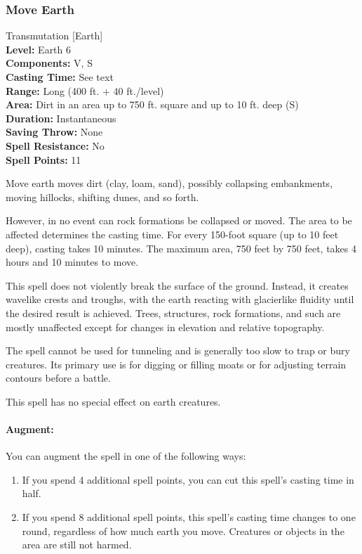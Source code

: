 \subsubsection{Move Earth}
\label{Spell:MoveEarth}
Transmutation [Earth]
\\ \textbf{Level:} Earth 6
\\ \textbf{Components:} V, S
\\ \textbf{Casting Time:} See text
\\ \textbf{Range:} Long (400 ft. + 40 ft./level)
\\ \textbf{Area:} Dirt in an area up to 750 ft. square and up to 10 ft. deep (S)
\\ \textbf{Duration:} Instantaneous
\\ \textbf{Saving Throw:} None
\\ \textbf{Spell Resistance:} No
\\ \textbf{Spell Points:} 11

Move earth moves dirt (clay, loam, sand), possibly collapsing embankments, moving hillocks, shifting dunes, and so forth.

However, in no event can rock formations be collapsed or moved. 
The area to be affected determines the casting time. For every 150-foot square (up to 10 feet deep), casting takes 10 minutes. 
The maximum area, 750 feet by 750 feet, takes 4 hours and 10 minutes to move.

This spell does not violently break the surface of the ground. 
Instead, it creates wavelike crests and troughs, with the earth reacting with glacierlike fluidity until the desired result is achieved. 
Trees, structures, rock formations, and such are mostly unaffected except for changes in elevation and relative topography.

The spell cannot be used for tunneling and is generally too slow to trap or bury creatures. 
Its primary use is for digging or filling moats or for adjusting terrain contours before a battle.

This spell has no special effect on earth creatures.

\paragraph{Augment:} You can augment the spell in one of the following ways:
\begin{enumerate}
 \item If you spend 4 additional spell points, you can cut this spell's casting time in half.
 \item If you spend 8 additional spell points, this spell's casting time changes to one round, regardless of how much earth you move. Creatures or objects in the area are still not harmed.
\end{enumerate}
